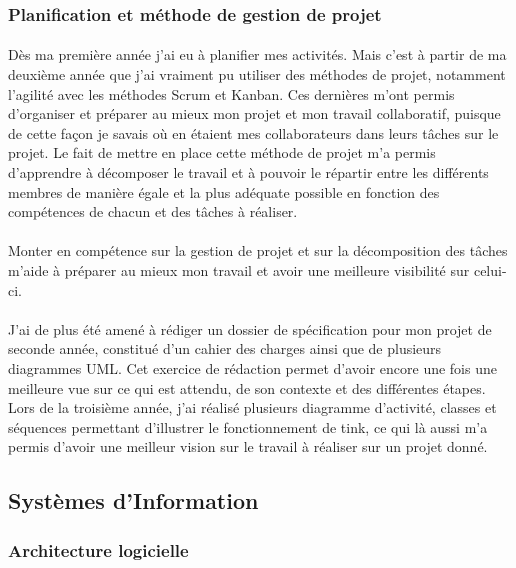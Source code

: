 \documentclass[12pt,a4paper]{report}
\begin{document}
\subsubsection{Planification et méthode de gestion de projet}
\paragraph*{}Dès ma première année j'ai eu à planifier mes activités. Mais c'est à partir de ma deuxième année que j'ai vraiment pu utiliser des méthodes de projet, notamment l'agilité avec les méthodes Scrum et Kanban. Ces dernières m'ont permis d'organiser et préparer au mieux mon projet et mon travail collaboratif, puisque de cette façon je savais où en étaient mes collaborateurs dans leurs tâches sur le projet. Le fait de mettre en place cette méthode de projet m'a permis d'apprendre à décomposer le travail et à pouvoir le répartir entre les différents membres de manière égale et la plus adéquate possible en fonction des compétences de chacun et des tâches à réaliser.
\paragraph*{}Monter en compétence sur la gestion de projet et sur la décomposition des tâches m'aide à préparer au mieux mon travail et avoir une meilleure visibilité sur celui-ci.
\paragraph*{}J'ai de plus été amené à rédiger un dossier de spécification pour mon projet de seconde année, constitué d'un cahier des charges ainsi que de plusieurs diagrammes UML. Cet exercice de rédaction permet d'avoir encore une fois une meilleure vue sur ce qui est attendu, de son contexte et des différentes étapes. Lors de la troisième année, j'ai réalisé plusieurs diagramme d'activité, classes et séquences permettant d'illustrer le fonctionnement de \gls{tink}, ce qui là aussi m'a permis d'avoir une meilleur vision sur le travail à réaliser sur un projet donné.\\

\subsection{Systèmes d'Information}
\subsubsection{Architecture logicielle}
\end{document}
